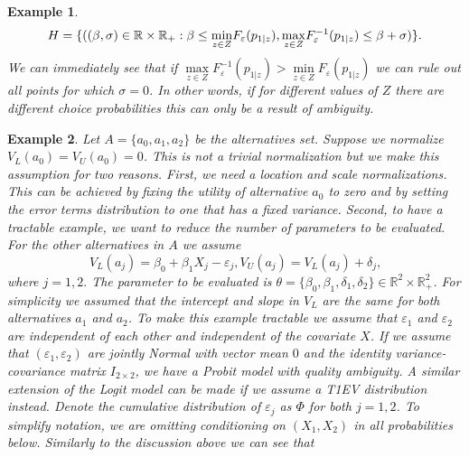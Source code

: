 \documentclass{article}
\newtheorem{example}{Example}
\begin{document}
\begin{example}
\begin{equation*}
H=\{((\beta ,\sigma )\in  \mathbb{R} \times \mathbb{R}_{+}:\beta \leq \underset{z\in Z}{\min }F_{\varepsilon }(p_{1|z}),\underset{%
z\in Z}{\max }F_{\varepsilon }^{-1}(p_{1|z})\leq \beta +\sigma )\}\text{.}
\end{equation*}%
We can immediately see that if $\underset{z\in Z}{\max }F_{\varepsilon
}^{-1}(p_{1|z})>\underset{z\in Z}{\min }F_{\varepsilon }(p_{1|z})$ we can
rule out all points for which $\sigma =0$. In other words, if for different
values of $Z$ there are different choice probabilities this can only be a
result of ambiguity. \newline
\relax
\end{example}

\begin{example}
Let $A=\{a_{0},a_{1},a_{2}\}$ be the alternatives set. Suppose we normalize $%
V_{L}(a_{0})=V_{U}(a_{0})=0$. This is not a trivial normalization but we
make this assumption for two reasons. First, we need a location and scale
normalizations. This can be achieved by fixing the utility of alternative $%
a_{0}$ to zero and by setting the error terms distribution to one that has a
fixed variance. Second, to have a tractable example, we want to reduce the
number of parameters to be evaluated. For the other alternatives in $A$ we
assume%
\begin{equation*}
V_{L}(a_{j})=\beta _{0}+\beta _{1}X_{j}-\varepsilon
_{j},V_{U}(a_{j})=V_{L}(a_{j})+\delta _{j}\text{,}
\end{equation*}%
where $j=1,2.$ The parameter to be evaluated is $\theta =\{\beta _{0},\beta
_{1},\delta _{1},\delta _{2}\}\in \mathbb{R}^{2}\times \mathbb{R}_{+}^{2}$. For simplicity we assumed that the intercept and slope in $V_{L}$
are the same for both alternatives $a_{1}$ and $a_{2}$. To make this example
tractable we assume that $\varepsilon _{1}$ and $\varepsilon _{2}$ are
independent of each other and independent of the covariate $X$. If we assume
that $(\varepsilon _{1},\varepsilon _{2})$ are jointly Normal with vector
mean $0$ and the identity variance-covariance matrix $I_{2\times 2}$, we
have a Probit model with quality ambiguity. A similar extension of the Logit
model can be made if we assume a T1EV distribution instead. Denote the
cumulative distribution of $\varepsilon _{j}$ as $\Phi $ for both $j=1,2$.
To simplify notation, we are omitting conditioning on $(X_{1},X_{2})$ in all
probabilities below. Similarly to the discussion above we can see that 
\begin{align*}

\end{align*}
\end{example}
\end{document}

